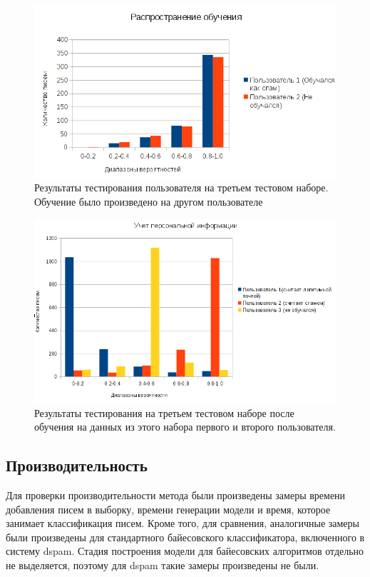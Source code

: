 \begin{figure}[h]
\begin{center}
\includegraphics[width=15cm]{img/experiment2}
\end{center}
\caption{Результаты тестирования пользователя на третьем тестовом наборе. Обучение было произведено на другом пользователе \cite{SAPC}}
\label{EXPERIMENT2}
\end{figure}

\begin{figure}[h]
\begin{center}
\includegraphics[width=15cm]{img/experiment3}
\end{center}
\caption{Результаты тестирования на третьем тестовом наборе после обучения на данных из этого набора первого и второго пользователя.}
\label{EXPERIMENT3}
\end{figure}


\subsection{Производительность}
Для проверки производительности метода были произведены замеры времени добавления писем в выборку, времени генерации модели и время, которое занимает классификация писем. Кроме того, для сравнения, аналогичные замеры были произведены для стандартного байесовского классификатора, включенного в систему dspam. Стадия построения модели для байесовских алгоритмов отдельно не выделяется, поэтому для dspam такие замеры произведены не были.


